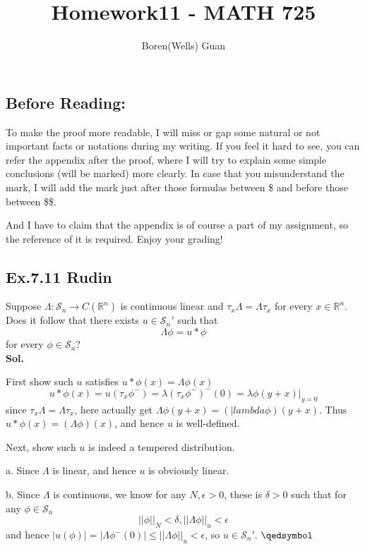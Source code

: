 \documentclass[lang=en,11pt,a4paper,citestyle =authoryear]{elegantpaper}
\title{Homework11 - MATH 725}
\author{Boren(Wells) Guan}
\newcommand{\prvd}{$\hfill \qedsymbol$}
\newcommand{\R}{\mathbb{R}}
\newcommand{\Sch}{\mathcal{S}}
\begin{document}
\maketitle

\subsection*{Before Reading:}\par
To make the proof more readable, I will miss or gap some natural or not important facts or notations during my writing. If you feel it hard to see, you can refer the appendix after the proof, where I will try to explain some simple conclusions (will be marked) more clearly. In case that you misunderstand the mark, I will add the mark just after those formulas between \$ and before those between \$\$.\par
And I have to claim that the appendix is of course a part of my assignment, so the reference of it is required. Enjoy your grading!

\subsection*{Ex.7.11 Rudin} 
Suppose $\Lambda:\Sch_n \to C(\R^n)$ is continuous linear and $\tau_x\Lambda = \Lambda\tau_x$ for every $x\in \R^n$. Does it follow that there exists $u\in\Sch_n'$ such that
\[\Lambda\phi = u*\phi\]
for every $\phi\in\Sch_n$?
\vspace{0.5em}\\
\textbf{Sol.} \par
First show such $u$ satisfies $u*\phi(x) = \Lambda \phi(x)$
\[
u*\phi(x) = u(\tau_x\phi^-) = \lambda (\tau_x\phi^-)^-(0) = \lambda \phi(y+x)|_{y=0}
\]
since $\tau_x\Lambda = \Lambda \tau_x$, here actually get $\Lambda \phi(y+x) = (|lambda \phi)(y+x)$. Thus $u*\phi(x) = (\Lambda \phi)(x)$, and hence $u$ is well-defined.\par
Next, show such $u$ is indeed a tempered distribution.\par
a. Since $\Lambda$ is linear, and hence $u$ is obviously linear.\par
b. Since $\Lambda$ is continuous, we know for any $N,\epsilon > 0$, these is $\delta > 0$ such that for any $\phi \in \Sch_n$
\[||\phi||_N < \delta, ||\Lambda \phi||_u < \epsilon\]
and hence $|u(\phi)| = |\Lambda\phi^-(0)| \leq ||\Lambda \phi||_u < \epsilon$, so $u\in\Sch_n'$.
\prvd
\end{document}
